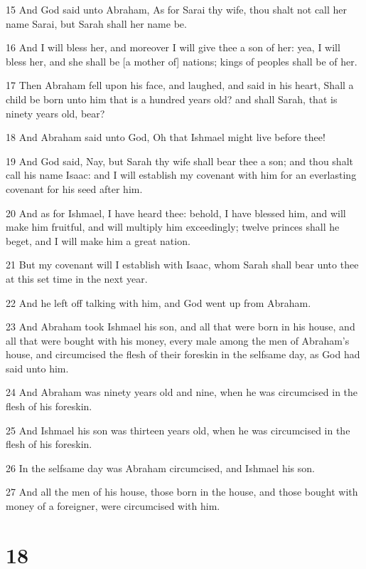 \par 15 And God said unto Abraham, As for Sarai thy wife, thou shalt not call her name Sarai, but Sarah shall her name be.
\par 16 And I will bless her, and moreover I will give thee a son of her: yea, I will bless her, and she shall be [a mother of] nations; kings of peoples shall be of her.
\par 17 Then Abraham fell upon his face, and laughed, and said in his heart, Shall a child be born unto him that is a hundred years old? and shall Sarah, that is ninety years old, bear?
\par 18 And Abraham said unto God, Oh that Ishmael might live before thee!
\par 19 And God said, Nay, but Sarah thy wife shall bear thee a son; and thou shalt call his name Isaac: and I will establish my covenant with him for an everlasting covenant for his seed after him.
\par 20 And as for Ishmael, I have heard thee: behold, I have blessed him, and will make him fruitful, and will multiply him exceedingly; twelve princes shall he beget, and I will make him a great nation.
\par 21 But my covenant will I establish with Isaac, whom Sarah shall bear unto thee at this set time in the next year.
\par 22 And he left off talking with him, and God went up from Abraham.
\par 23 And Abraham took Ishmael his son, and all that were born in his house, and all that were bought with his money, every male among the men of Abraham's house, and circumcised the flesh of their foreskin in the selfsame day, as God had said unto him.
\par 24 And Abraham was ninety years old and nine, when he was circumcised in the flesh of his foreskin.
\par 25 And Ishmael his son was thirteen years old, when he was circumcised in the flesh of his foreskin.
\par 26 In the selfsame day was Abraham circumcised, and Ishmael his son.
\par 27 And all the men of his house, those born in the house, and those bought with money of a foreigner, were circumcised with him.

\chapter{18}

